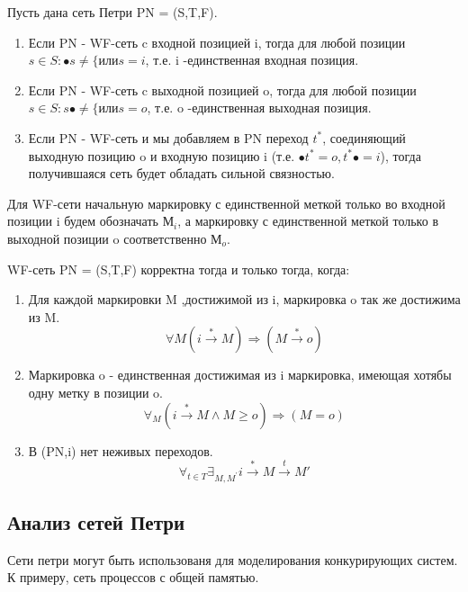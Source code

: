 \documentclass[a4paper,14pt]{article}
\newenvironment{definition}[1]{\begin{trivlist}
\item[\hskip \labelsep {\bfseries #1}]}{\end{trivlist}}
\begin{document}
\begin{definition}{Определение: WF-сеть(Workflow-net)}
  Пусть дана сеть Петри PN = (S,T,F).
  \begin{enumerate}
    \item[-] Если PN - WF-сеть c входной позицией i, тогда для любой позиции $s \in S: \bullet s \neq \lbrace или s = i$, т.е. i -единственная входная позиция.
    \item[-] Если PN - WF-сеть c выходной позицией o, тогда для любой позиции $s \in S:  s\bullet \neq \lbrace или s = o$, т.е. o -единственная выходная позиция.
     \item[-] Если PN - WF-сеть и мы добавляем в PN переход $t^{*}$, соединяющий выходную позицию o и входную позицию i (т.е. $\bullet t^{*} = {o}, t^{*} \bullet = {i}$), тогда получившаяся сеть будет обладать сильной связностью.
 \end{enumerate}
 
Для WF-сети начальную маркировку с единственной меткой только во входной позиции i будем обозначать $М_{i}$, а маркировку с единственной меткой только в выходной позиции o соответственно $М_{o}$.
\end{definition}
	
\begin{definition}{Определение: Корректность(Sound)}
	WF-сеть PN = (S,T,F) корректна тогда и только тогда, когда:
	  \begin{enumerate}
	  \item[(i)] Для каждой маркировки M ,достижимой из i, маркировка o так же достижима из M.
	  \begin{equation}
	  	\forall{M}  (i \xrightarrow{*} M) \Rightarrow (M \xrightarrow{*} o)
	  \end{equation}
	  \item[(ii)] Маркировка o - единственная достижимая из i маркировка, имеющая хотябы одну метку в позиции o.
	  \begin{equation}
	  	\forall_{M}  (i \xrightarrow{*} M \wedge M \geq o) \Rightarrow (M = o)
	  \end{equation} 
	  \item[(iii)] В (PN,i) нет неживых переходов.
	  \begin{equation}
	  	\forall_{t \in T} \exists_{M, M^{'}}   i \xrightarrow{*} M  \xrightarrow{t}M'
	  \end{equation}	   
	  \end{enumerate}
\end{definition}
\subsection{Анализ сетей Петри}
Сети петри могут быть использованя для моделирования конкурирующих систем. К примеру, сеть процессов с общей памятью. 
\end{document}
